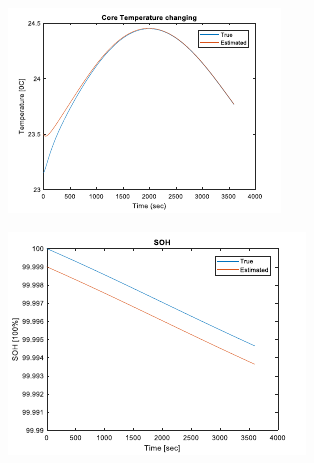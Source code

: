 \documentclass[12pt]{article}
\begin{document}
\begin{figure}[H]
\begin{subfigure}[t]{0.3\linewidth}
	\end{subfigure}	
	\begin{subfigure}[t]{0.3\linewidth}
		\includegraphics[width=\linewidth]{figures/estVoltIni3.pdf}
	\end{subfigure}
	\begin{subfigure}[t]{0.3\linewidth}
		\includegraphics[width=\linewidth]{figures/estVoltIni4.pdf}
	\end{subfigure}	
	\begin{subfigure}[t]{0.3\linewidth}

\end{subfigure}
\end{figure}
\end{document}
